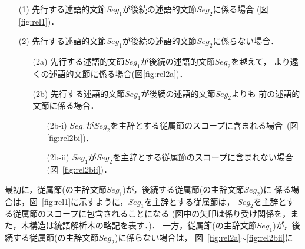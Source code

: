 \begin{enumerate}
  \item[(1)] 先行する述語的文節$Seg_1$が後続の述語的文節$Seg_2$に係る場合
	(図\ref{fig:rel1})． 
  \item[(2)] 先行する述語的文節$Seg_1$が後続の述語的文節$Seg_2$に係らない場合．
	\begin{enumerate}
	  \item[(2a)] 先行する述語的文節$Seg_1$が後続の述語的文節$Seg_2$を越えて，
		より遠くの述語的文節に係る場合(図\ref{fig:rel2a})．
	  \item[(2b)] 先行する述語的文節$Seg_1$が後続の述語的文節$Seg_2$よりも 
		前の述語的文節に係る場合． 
		\begin{enumerate}
		  \item[(2b-i)] 
		$Seg_1$\hspace{-0.5pt}が\hspace{-0.5pt}$Seg_2$\hspace{-0.5pt}を主辞とする従属節のスコープに\mbox{含まれる場合
				(図\ref{fig:rel2bi})}．
		  \item[(2b-ii)] 
		$Seg_1$が$Seg_2$を主辞とする従属節のスコープに含まれない場合
				(図~\ref{fig:rel2bii})．
		\end{enumerate}
	\end{enumerate}
\end{enumerate}


\medskip
\noindent
\begin{minipage}{\textwidth}
最初に，従属節(の主辞文節$Seg_1$)が，後続する従属節(の主辞文節$Seg_2$)に
係る場合は，図~\ref{fig:rel1}に示すように，$Seg_1$を主辞とする従属節は，
$Seg_2$を主辞とする従属節のスコープに包含されることになる
(図中の矢印は係り受け関係を，また，木構造は統語解析木の略記を表す．)．
一方，従属節(の主辞文節$Seg_1$)が，後続する従属節(の主辞文節$Seg_2$)に係らない場合は，
図~\ref{fig:rel2a}$\sim$\ref{fig:rel2bii}に
\end{minipage}


